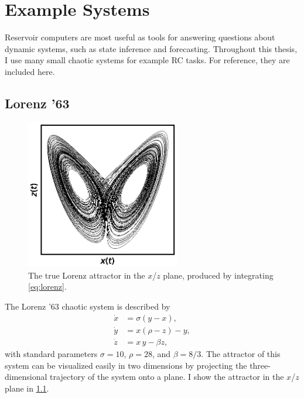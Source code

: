 \chapter{Example Systems}\label{ch:systems}

Reservoir computers are most useful as tools for answering questions
about dynamic systems, such as state inference and
forecasting. Throughout this thesis, I use many small chaotic systems
for example RC tasks. For reference, they are included here.

\section{Lorenz '63}\label{sec:lorenz}

\begin{figure}
  \includegraphics[width=0.6\textwidth]{figures/lorenz}
  \caption{The true Lorenz attractor in the $x$/$z$ plane, produced by integrating \cref{eq:lorenz}.}%
  \label{fig:lorenz}
\end{figure}

The Lorenz '63 chaotic system is described by
\begin{equation}
  \begin{aligned}
    \dot{x} &= \sigma \left(y - x\right), \\
    \dot{y} &= x \left(\rho - z\right) - y, \\
    \dot{z} &= x\,y - \beta z,
  \end{aligned}
  \label{eq:lorenz}
\end{equation}
with standard parameters $\sigma = 10$, $\rho = 28$, and $\beta = 8/3$.\cite{lorenz1963} The attractor of this
system can be visualized easily in two dimensions by projecting the
three-dimensional trajectory of the system onto a plane. I show the
attractor in the $x$/$z$ plane in \cref{fig:lorenz}.

